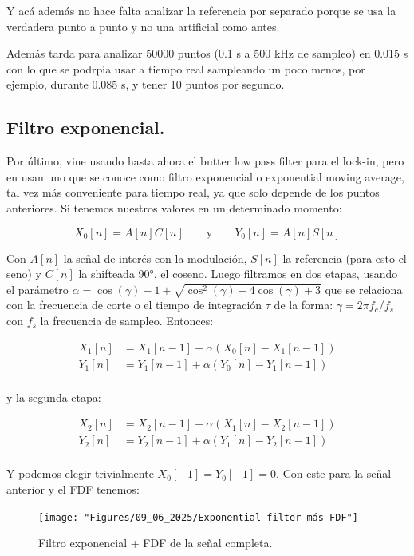 Y acá además no hace falta analizar la referencia por separado porque se usa la verdadera punto a punto y no una artificial como antes.

Además tarda para analizar 50000 puntos (0.1 s a 500 kHz de sampleo) en 0.015 s con lo que se podrpia usar a tiempo real sampleando un poco menos, por ejemplo, durante 0.085 s, y tener 10 puntos por segundo.

\subsection*{Filtro exponencial.}
Por último, vine usando hasta ahora el butter low pass filter para el lock-in, pero en \cite{harvieOLIAOpensourceDigital2023} usan uno que se conoce como filtro exponencial o exponential moving average, tal vez más conveniente para tiempo real, ya que solo depende de los puntos anteriores. Si tenemos nuestros valores en un determinado momento:

\begin{equation}
	X_0[n] = A[n]C[n] \qquad \text{y} \qquad Y_0[n] = A[n]S[n]
\end{equation}

Con $A[n]$ la señal de interés con la modulación, $S[n]$ la referencia (para esto el seno) y $C[n]$ la shifteada 90°, el coseno. Luego filtramos en dos etapas, usando el parámetro $\alpha=\cos(\gamma)-1+\sqrt{\cos^2(\gamma)-4\cos(\gamma)+3}$ que se relaciona con la frecuencia de corte o el tiempo de integración $\tau$ de la forma: $\gamma=2\pi f_c/f_s$ con $f_s$ la frecuencia de sampleo. Entonces:

\begin{align}
	X_1[n] &= X_1[n-1] + \alpha(X_0[n]-X_1[n-1]) \\
	Y_1[n] &= Y_1[n-1] + \alpha(Y_0[n]-Y_1[n-1]) \\
\end{align}

y la segunda etapa: 

\begin{align}
		X_2[n] &= X_2[n-1] + \alpha(X_1[n]-X_2[n-1]) \\
		Y_2[n] &= Y_2[n-1] + \alpha(Y_1[n]-Y_2[n-1]) \\
\end{align}

Y podemos elegir trivialmente $X_0[-1]=Y_0[-1]=0$. Con este para la señal anterior y el FDF tenemos: 

\begin{figure}[th!]
	\centering
	\texttt{[image: "Figures/09\_06\_2025/Exponential filter más FDF"]}
	\caption{Filtro exponencial + FDF de la señal completa.}
	\label{fig:exponential-filter-mas-fdf}
\end{figure}


